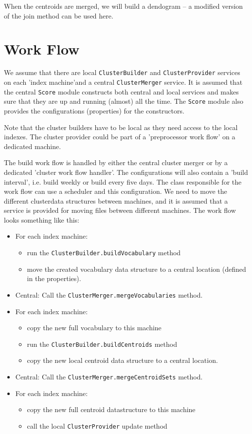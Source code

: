 \documentclass[a4paper,12pt]{article}
\begin{document}
When the centroids are merged, we will build a dendogram -- a modified
version of the join method can be used here.

\section{Work Flow}
\label{work-flow}

We assume that there are local \texttt{ClusterBuilder} and
\texttt{ClusterProvider} services on each 'index machine'and a central
\texttt{ClusterMerger} service.  
It is assumed that the central \texttt{Score} module constructs both
central and local services and makes sure that they are up and running
(almost) all the time. The \texttt{Score} module also provides the
configurations (properties) for the constructors. 

Note that the cluster builders have to be local as they need access to
the local indexes. The cluster provider could be part of a
'preprocessor work flow' on a dedicated machine.

The build work flow is handled by either the central cluster merger or
by a dedicated 'cluster work flow handler'. The configurations will
also contain a 'build interval', i.e. build weekly or build every five
days. The class responsible for the work flow can use a scheduler and
this configuration. We need to move the different clusterdata
structures between machines, and it is assumed that a service is
provided for moving files between different machines. The work flow
looks something like this:

\begin{itemize}
\item{For each index machine: 
  \begin{itemize}
  \item{run the \texttt{ClusterBuilder.buildVocabulary} method}
  \item{move the created vocabulary data structure to a central
    location (defined in the properties).}
  \end{itemize}}
\item{Central: Call the \texttt{ClusterMerger.mergeVocabularies}
    method.}
\item{For each index machine: 
  \begin{itemize}
  \item{copy the new full vocabulary to this machine}
  \item{run the \texttt{ClusterBuilder.buildCentroids} method}
  \item{copy the new local centroid data structure to a central
    location.}
  \end{itemize}}
\item{Central: Call the \texttt{ClusterMerger.mergeCentroidSets} method.}
\item{For each index machine: 
  \begin{itemize}
  \item{copy the new full centroid datastructure to this machine}
  \item{call the local \texttt{ClusterProvider} update method}
  \end{itemize}}
\end{itemize}
\end{document}
